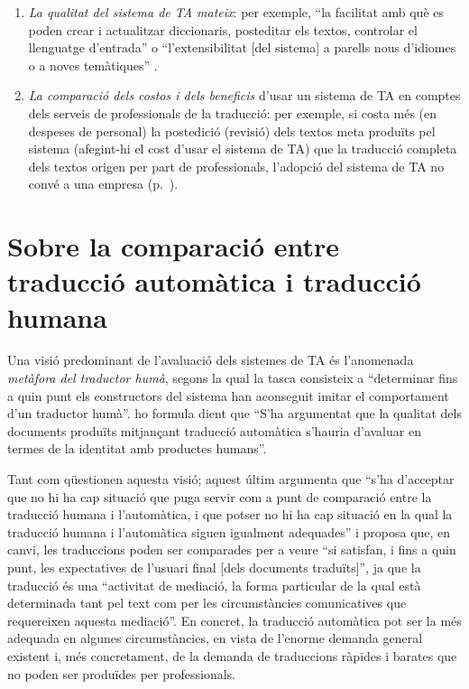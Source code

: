 \begin{enumerate}
\begin{enumerate}
D'altra banda, sempre s'ha de tenir en compte que els mètodes
d'avaluació de la qualitat depenen de l'ús que es pensa donar al
sistema de TA \citep{arnold93j}; per exemple, l'avaluació d'un sistema
que s'usa per a la \emph{disseminació} de material és ben diferent de
l'avaluació d'un sistema usat per a l'\emph{assimilació}
d'informació.\footnote{De nou, com s'ha discutit en el capítol~\ref{se:TiTA}, la
  noció central és la de \emph{propòsit} de la traducció.}

\item \emph{La qualitat del sistema de TA mateix}: per exemple, ``la facilitat amb
  què es poden crear i actualitzar diccionaris, posteditar els
  textos, controlar el llenguatge d'entrada'' o
  ``l'extensibilitat [del sistema] a parells nous d'idiomes o a noves temàtiques''
  \citep{hutchins96u}.
\item \emph{La comparació dels costos i dels beneficis} d'usar un
  sistema de TA en comptes dels serveis de professionals de la
  traducció: per exemple, si costa més (en despeses de personal) la
  postedició (revisió) dels textos meta produïts pel sistema
  (afegint-hi el cost d'usar el sistema de TA) que la traducció
  completa dels textos origen per part de professionals, l'adopció del
  sistema de TA no convé a una empresa (p.~\pageref{pg:cost}).
\end{enumerate}
\end{enumerate}

\section[Traducció automàtica i traducció humana]{Sobre la comparació entre traducció auto\-mà\-tica i
  traducció humana} 
\label{ss:humaut}
Una visió predominant de l'avaluació dels sistemes de TA és
l'anomenada \emph{metàfora del traductor humà}, segons la qual
\citep{krauwer93j} la tasca consisteix a ``determinar fins a quin punt
els constructors del sistema han aconseguit imitar el comportament
d'un traductor humà''. \citet{sager93b} ho formula dient que ``S'ha
argumentat que la qualitat dels documents produïts mitjançant
traducció automàtica s'hauria d'avaluar en termes de la identitat amb
productes humans''.
  
Tant \citet{krauwer93j} com \citet{sager93b} qüestionen aquesta visió;
aquest últim argumenta que ``s'ha d'acceptar que no hi ha cap situació
que puga servir com a punt de comparació entre la traducció humana i
l'automàtica, i que potser no hi ha cap situació en la qual la
traducció humana i l'automàtica siguen igualment adequades'' i proposa
que, en canvi, les traduccions poden ser comparades per a veure ``si
satisfan, i fins a quin punt, les expectatives de l'usuari final [dels
documents traduïts]'', ja que la traducció és una ``activitat de
mediació, la forma particular de la qual està determinada tant pel
text com per les circumstàncies comunicatives que requereixen aquesta
mediació''.  En concret, la
traducció automàtica pot ser la més adequada en algunes
circumstàncies, en vista de l'enorme demanda general existent i, més
concretament, de la demanda de traduccions ràpides i barates que no
poden ser produïdes per professionals.

